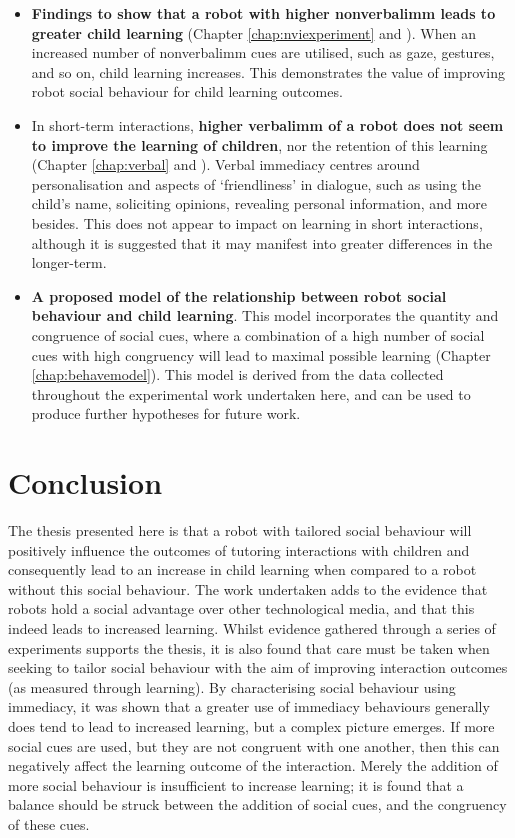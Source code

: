 \begin{itemize}
	\item \textbf{Findings to show that a robot with higher \gls{nonverbalimm} leads to greater child \gls{learning}} (Chapter \ref{chap:nviexperiment} and \citealp{kennedy2015higher}). When an increased number of \gls{nonverbalimm} cues are utilised, such as gaze, gestures, and so on, child \gls{learning} increases. This demonstrates the value of improving robot social behaviour for child \gls{learning} outcomes.
	
	\item In short-term interactions, \textbf{higher \gls{verbalimm} of a robot does not seem to improve the \gls{learning} of children}, nor the retention of this \gls{learning} (Chapter \ref{chap:verbal} and \citealp{kennedy2016social}). Verbal immediacy centres around personalisation and aspects of `friendliness' in dialogue, such as using the child's name, soliciting opinions, revealing personal information, and more besides. This does not appear to impact on \gls{learning} in short interactions, although it is suggested that it may manifest into greater differences in the longer-term.
	
	\item \textbf{A proposed model of the relationship between robot social behaviour and child \gls{learning}}. This model incorporates the quantity and congruence of social cues, where a combination of a high number of social cues with high congruency will lead to maximal possible \gls{learning} (Chapter \ref{chap:behavemodel}). This model is derived from the data collected throughout the experimental work undertaken here, and can be used to produce further hypotheses for future work.
	
\end{itemize}

\section{Conclusion}\label{sec:conc-conc}
The thesis presented here is that a robot with \gls{tailored} social behaviour will positively influence the outcomes of tutoring interactions with children and consequently lead to an increase in child \gls{learning} when compared to a robot without this social behaviour. The work undertaken adds to the evidence that robots hold a social advantage over other technological media, and that this indeed leads to increased \gls{learning}. Whilst evidence gathered through a series of experiments supports the thesis, it is also found that care must be taken when seeking to tailor social behaviour with the aim of improving interaction outcomes (as measured through \gls{learning}). By characterising social behaviour using immediacy, it was shown that a greater use of immediacy behaviours generally does tend to lead to increased \gls{learning}, but a complex picture emerges. If more social cues are used, but they are not congruent with one another, then this can negatively affect the \gls{learning} outcome of the interaction. Merely the addition of more social behaviour is insufficient to increase \gls{learning}; it is found that a balance should be struck between the addition of social cues, and the congruency of these cues.